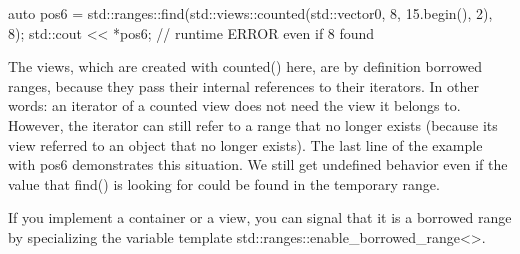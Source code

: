 \begin{itemize}
\begin{cpp}
auto pos6 = std::ranges::find(std::views::counted(std::vector{0, 8, 15}.begin(),
							2), 8);
std::cout << *pos6; // runtime ERROR even if 8 found
\end{cpp}

The views, which are created with counted() here, are by definition borrowed ranges, because they pass their internal references to their iterators. In other words: an iterator of a counted view does not need the view it belongs to. However, the iterator can still refer to a range that no longer exists (because its view referred to an object that no longer exists). The last line of the example with pos6 demonstrates this situation. We still get undefined behavior even if the value that find() is looking for could be found in the temporary range.

\end{itemize}

If you implement a container or a view, you can signal that it is a borrowed range by specializing the variable template std::ranges::enable\_borrowed\_range<>.








